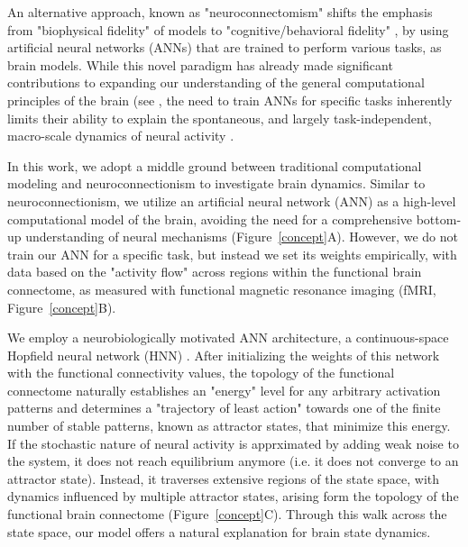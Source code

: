 \documentclass{article}
\begin{document}
An alternative approach, known as "neuroconnectomism" \citep{doerig2023neuroconnectionist} shifts the
emphasis from "biophysical fidelity" of models to "cognitive/behavioral fidelity"
\citep{kriegeskorte2018cognitive}, by using artificial neural networks (ANNs) that are trained to
perform various tasks, as brain models.
While this novel paradigm has already made significant contributions to expanding our understanding of the general
computational principles of the brain (see \citep{doerig2023neuroconnectionist}, the need to train ANNs for
specific tasks inherently limits their ability to explain the spontaneous, and largely task-independent, macro-scale
dynamics of neural activity \citep{richards2019deep}.

In this work, we adopt a middle ground between traditional computational modeling and neuroconnectionism to investigate brain dynamics.
Similar to neuroconnectionism, we utilize an artificial neural network (ANN) as a high-level computational model of the brain, avoiding the need for a comprehensive bottom-up understanding of neural mechanisms (Figure~\ref{concept}A).
However, we do not train our ANN for a specific task, but instead we set its weights empirically, with data based
on the "activity flow" \citep{cole2016activity, ito2017cognitive}
across regions within the functional brain connectome, as measured with functional magnetic resonance imaging
(fMRI, Figure~\ref{concept}B).

We employ a neurobiologically motivated ANN architecture, a continuous-space Hopfield neural network (HNN) \citep{hopfield1982neural, krotov2023new}.
After initializing the weights of this network with the functional connectivity values, the topology of the functional connectome naturally establishes an "energy" level for any arbitrary activation patterns and determines a "trajectory of least action" towards one of the finite number of stable patterns, known as attractor states, that minimize this energy.
If the stochastic nature of neural activity is apprximated by adding weak noise to the system, it does not reach equilibrium anymore (i.e. it does not converge to an attractor state).
Instead, it traverses extensive regions of the state space, with dynamics influenced by multiple attractor states, arising form the topology of the functional brain connectome (Figure~\ref{concept}C). Through this walk across the state space, our model offers a natural explanation for brain state dynamics.
\end{document}
